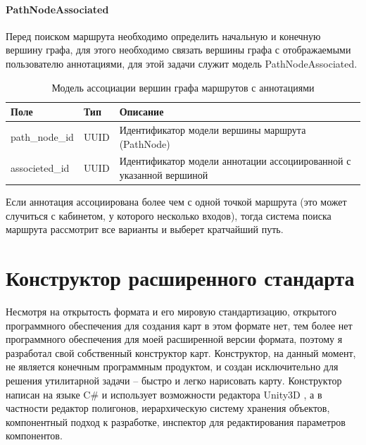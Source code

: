         \paragraph{PathNodeAssociated}
          Перед поиском маршрута необходимо определить начальную и конечную вершину графа, для этого необходимо связать вершины графа с отображаемыми пользователю аннотациями, для этой задачи служит модель PathNodeAssociated.
          \begin{center}
            \begin{xltabular}{\linewidth}{|l|p{4cm}|X|}
              \caption{Модель ассоциации вершин графа маршрутов с аннотациями}\\\hline
              Поле            & Тип  & Описание                                                                                                             \\ \hline
              path\_node\_id  & UUID & Идентификатор модели вершины маршрута (PathNode)                                                                     \\ \hline
              associeted\_id  & UUID & Идентификатор модели аннотации ассоциированной с указанной вершиной \\ \hline
            \end{xltabular}
          \end{center}


          Если аннотация ассоциирована более чем с одной точкой маршрута (это может случиться с кабинетом, у которого несколько входов), тогда система поиска маршрута рассмотрит все варианты и выберет кратчайший путь.

  \section{Конструктор расширенного стандарта}
    Несмотря на открытость формата и его мировую стандартизацию, открытого программного обеспечения для создания карт в этом формате нет, тем более нет программного обеспечения для моей расширенной версии формата, поэтому я разработал свой собственный конструктор карт. Конструктор, на данный момент, не является конечным программным продуктом, и создан исключительно для решения утилитарной задачи -- быстро и легко нарисовать карту. Конструктор написан на языке C\# и использует возможности редактора Unity3D \cite{Unity3D}, а в частности редактор полигонов, иерархическую систему хранения объектов, компонентный подход к разработке, инспектор для редактирования параметров компонентов.

